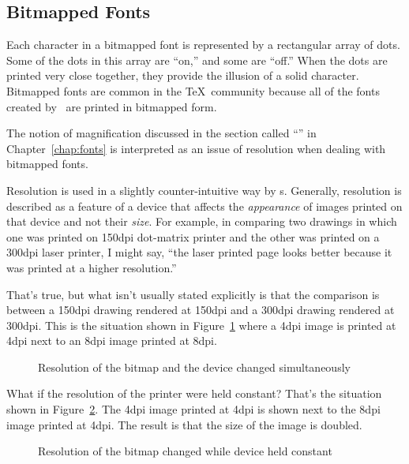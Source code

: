 \subsection{Bitmapped Fonts}
\label{sec:bitfonts}

Each character in a bitmapped font is represented by a rectangular
array of dots.  Some of the dots in this array are ``on,'' and some are
``off.''  When the dots are printed very close together, they provide
the illusion of a solid character.  Bitmapped fonts are common in the
\TeX\ community because all of the fonts created by \MF\ are printed
in bitmapped form.

The notion of magnification discussed in the section called
``'' in Chapter~\ref{chap:fonts}
is interpreted as an issue of resolution
when dealing with bitmapped fonts.

Resolution is used 
in a slightly counter-intuitive way by
\dvidriver{}s.  Generally, resolution is described as a feature of a
device that affects the {\em appearance\/} of images printed on that
device and not their {\em size}.  For example, in comparing two
drawings in which one was printed on 150dpi
dot-matrix printer and the other
was printed on a 300dpi laser printer, I might say, ``the laser printed page
looks better because it was printed at a higher resolution.''

That's true, but what isn't usually stated explicitly is that the
comparison is between a 150dpi drawing rendered at 150dpi and a
300dpi drawing rendered at 300dpi.  This is the situation shown
in Figure~\ref{fig:reschange} where a 4dpi image is printed at 4dpi
next to an 8dpi image printed at 8dpi.

\begin{figure}
  \begin{center}
    
    \caption{Resolution of the bitmap and the device changed simultaneously}
    \label{fig:reschange}
  \end{center}
\end{figure}

What if the resolution of the printer were held constant?  That's
the situation shown in Figure~\ref{fig:sizechange}.  The 4dpi image printed
at 4dpi is shown next to the 8dpi image printed at 4dpi.  The result
is that the size of the image is doubled.

\begin{figure}
  \begin{center}
    
    \caption{Resolution of the bitmap changed while device held constant}
    \label{fig:sizechange}
  \end{center}
\end{figure}

